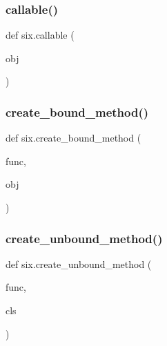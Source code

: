 \mbox{\label{namespacesix_a136c01fffede39c0dc0f4df67f57632f}} 
\subsubsection{\texorpdfstring{callable()}{callable()}}
{\footnotesize\ttfamily def six.\+callable (\begin{DoxyParamCaption}\item[{}]{obj }\end{DoxyParamCaption})}

\mbox{\label{namespacesix_a84be7bb1ab8be3e70269a536e0625503}} 
\subsubsection{\texorpdfstring{create\+\_\+bound\+\_\+method()}{create\_bound\_method()}}
{\footnotesize\ttfamily def six.\+create\+\_\+bound\+\_\+method (\begin{DoxyParamCaption}\item[{}]{func,  }\item[{}]{obj }\end{DoxyParamCaption})}

\mbox{\label{namespacesix_a803bd1806ed54b90ff035fcdca87ac6d}} 
\subsubsection{\texorpdfstring{create\+\_\+unbound\+\_\+method()}{create\_unbound\_method()}}
{\footnotesize\ttfamily def six.\+create\+\_\+unbound\+\_\+method (\begin{DoxyParamCaption}\item[{}]{func,  }\item[{}]{cls }\end{DoxyParamCaption})}

\mbox{\label{namespacesix_a5151099b4e703601f34a658d42c14100}} 
